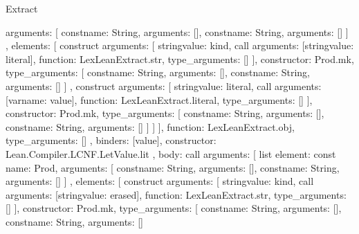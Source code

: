 \begin{lexlean}{Extract}
\begin{toolingmodule}
{{{{{{{                    arguments: [
                      const{name: String, arguments: []},
                      const{name: String, arguments: []}
                    ]
                  },
                  elements: [
                    construct{
                      arguments: [
                        string{value: kind},
                        call{
                          arguments: [string{value: literal}],
                          function: LexLeanExtract.str,
                          type_arguments: []
                        }
                      ],
                      constructor: Prod.mk,
                      type_arguments: [
                        const{name: String, arguments: []},
                        const{name: String, arguments: []}
                      ]
                    },
                    construct{
                      arguments: [
                        string{value: literal},
                        call{
                          arguments: [var{name: value}],
                          function: LexLeanExtract.literal,
                          type_arguments: []
                        }
                      ],
                      constructor: Prod.mk,
                      type_arguments: [
                        const{name: String, arguments: []},
                        const{name: String, arguments: []}
                      ]
                    }
                  ]
                }
              ],
              function: LexLeanExtract.obj,
              type_arguments: []
            },
            binders: [value],
            constructor: Lean.Compiler.LCNF.LetValue.lit
          },
          {
            body: call{
              arguments: [
                list{
                  element: const{
                    name: Prod,
                    arguments: [
                      const{name: String, arguments: []},
                      const{name: String, arguments: []}
                    ]
                  },
                  elements: [
                    construct{
                      arguments: [
                        string{value: kind},
                        call{
                          arguments: [string{value: erased}],
                          function: LexLeanExtract.str,
                          type_arguments: []
                        }
                      ],
                      constructor: Prod.mk,
                      type_arguments: [
                        const{name: String, arguments: []},
                        const{name: String, arguments: []}
}}}}}}}
\end{toolingmodule}
\end{lexlean}
